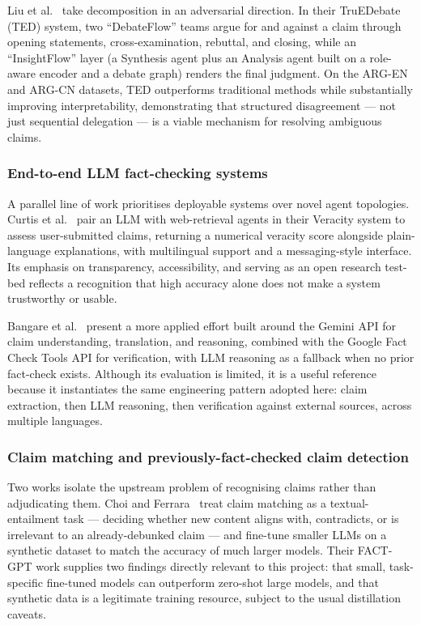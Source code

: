 \documentclass[12pt,a4paper]{article}
\begin{document}
Liu et al.~\cite{ted} take decomposition in an adversarial direction. In their
TruEDebate (TED) system, two ``DebateFlow'' teams argue for and against a claim
through opening statements, cross-examination, rebuttal, and closing, while an
``InsightFlow'' layer (a Synthesis agent plus an Analysis agent built on a
role-aware encoder and a debate graph) renders the final judgment. On the ARG-EN
and ARG-CN datasets, TED outperforms traditional methods while substantially
improving interpretability, demonstrating that structured disagreement --- not
just sequential delegation --- is a viable mechanism for resolving ambiguous
claims.

\subsubsection{End-to-end LLM fact-checking systems}
A parallel line of work prioritises deployable systems over novel agent
topologies. Curtis et al.~\cite{veracity} pair an LLM with web-retrieval agents in
their Veracity system to assess user-submitted claims, returning a numerical
veracity score alongside plain-language explanations, with multilingual support
and a messaging-style interface. Its emphasis on transparency, accessibility, and
serving as an open research test-bed reflects a recognition that high accuracy
alone does not make a system trustworthy or usable.

Bangare et al.~\cite{bangare} present a more applied effort built around the
Gemini API for claim understanding, translation, and reasoning, combined with the
Google Fact Check Tools API for verification, with LLM reasoning as a fallback
when no prior fact-check exists. Although its evaluation is limited, it is a useful
reference because it instantiates the same engineering pattern adopted here: claim
extraction, then LLM reasoning, then verification against external sources, across
multiple languages.

\subsubsection{Claim matching and previously-fact-checked claim detection}
Two works isolate the upstream problem of recognising claims rather than
adjudicating them. Choi and Ferrara~\cite{factgpt} treat claim matching as a
textual-entailment task --- deciding whether new content aligns with, contradicts,
or is irrelevant to an already-debunked claim --- and fine-tune smaller LLMs on a
synthetic dataset to match the accuracy of much larger models. Their FACT-GPT work
supplies two findings directly relevant to this project: that small, task-specific
fine-tuned models can outperform zero-shot large models, and that synthetic data
is a legitimate training resource, subject to the usual distillation caveats.
\end{document}
